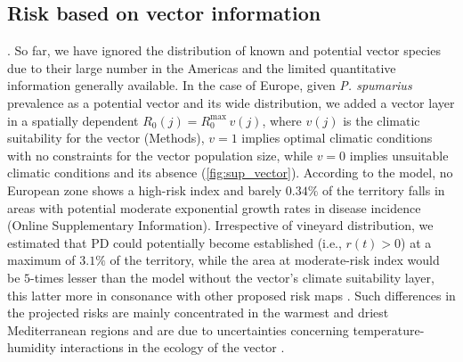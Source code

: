     \subsection{Risk based on vector information}. So far, we have ignored
    the
    distribution of known and potential vector species due to their large
    number in
    the Americas and the limited quantitative information generally available.
    In
    the case of Europe, given \textit{P. spumarius} prevalence as a potential
    vector and its wide distribution, we added	a vector layer in a spatially
    dependent $R_0(j) = R_0^{\textrm{max}}\, v(j)$, where $v(j)$ is the
    climatic
    suitability for the vector (Methods), $v=1$ implies optimal climatic
    conditions
    with no constraints for the vector population size, while $v=0$ implies
    unsuitable climatic conditions and its absence (\cref{fig:sup_vector}).
    According to the model, no European zone shows a high-risk index and barely
$0.34\%$ of the territory falls in areas with potential moderate exponential
    growth rates in disease incidence (Online Supplementary Information).
    Irrespective
    of
    vineyard
    distribution, we estimated that PD could potentially become established
    (i.e.,
$r(t) > 0$) at a maximum of $3.1\%$ of the territory, while the area at
    moderate-risk index would be $5$-times lesser than the model without the
    vector's climate suitability layer, this latter more in consonance with
    other
    proposed risk maps \cite{Godefroid2019,Bragard2019}. Such differences in
    the
    projected risks are mainly concentrated in the warmest and driest
    Mediterranean
    regions and are due to uncertainties concerning temperature-humidity
    interactions in the ecology of the vector \cite{Godefroid2021}.

